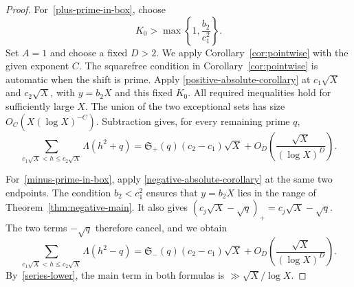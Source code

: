 \documentclass[12pt,reqno]{amsart}
\numberwithin{equation}{section}
\theoremstyle{plain}
\theoremstyle{remark}
\begin{document}
\begin{proof}
For~\eqref{plus-prime-in-box}, choose
\begin{equation}\label{small-box-K0}
 K_0>\max\left\{1,\frac{b_2}{c_1^2}\right\}.
\end{equation}
Set $A=1$ and choose a fixed $D>2$.  We apply
Corollary~\ref{cor:pointwise} with the given exponent $C$.  The squarefree condition in Corollary~\ref{cor:pointwise}
is automatic when the shift is prime.  Apply
\eqref{positive-absolute-corollary} at $c_1\sqrt X$ and
$c_2\sqrt X$, with $y=b_2X$ and this fixed $K_0$.  All required
inequalities hold for sufficiently large $X$.  The union of the two
exceptional sets has size $O_C(X(\log X)^{-C})$.  Subtraction gives,
for every remaining prime $q$,
\begin{equation*}\label{positive-pointwise-interval}
\sum_{c_1\sqrt X<h\leq c_2\sqrt X}
  \Lambda(h^2+q)
=\mathfrak S_+(q)(c_2-c_1)\sqrt X
  +O_D\left(\frac{\sqrt X}{(\log X)^D}\right).
\end{equation*}

For~\eqref{minus-prime-in-box}, apply
\eqref{negative-absolute-corollary} at the same two endpoints.  The
condition $b_2<c_1^2$ ensures that $y=b_2X$ lies in the range of
Theorem~\ref{thm:negative-main}.  It also gives
$(c_j\sqrt X-\sqrt q)_+=c_j\sqrt X-\sqrt q$.  The two terms
$-\sqrt q$ therefore cancel, and we obtain
\begin{equation*}\label{negative-pointwise-interval}
 \sum_{c_1\sqrt X<h\leq c_2\sqrt X}
  \Lambda(h^2-q)
=\mathfrak S_-(q)(c_2-c_1)\sqrt X
  +O_D\left(\frac{\sqrt X}{(\log X)^D}\right).
\end{equation*}
By~\eqref{series-lower}, the main term in both formulas is
$\gg\sqrt X/\log X$.


\end{proof}
\end{document}
